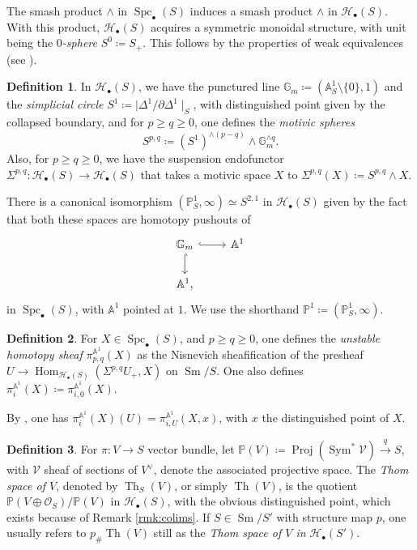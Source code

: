 \documentclass[10pt]{amsart}
\theoremstyle{definition}
\newtheorem{defn}{Definition}[section]
\theoremstyle{plain}
\numberwithin{equation}{section}
\newcommand{\0}{\emptyset}
\newcommand{\sH}{{\mathcal H}}
\newcommand{\sV}{{\mathcal V}}
\newcommand{\A}{{\mathbb A}}
\newcommand{\G}{{\mathbb G}}
\renewcommand{\P}{{\mathbb P}}
\newcommand{\Th}{{\operatorname{Th}}}
\newcommand{\Spc}{{\operatorname{Spc}}}
\newcommand{\Sm}{{\operatorname{Sm}}}
\newcommand{\Hom}{{\operatorname{Hom}}}
\newcommand{\Sym}{{\operatorname{Sym}}}
\begin{document}
The smash product $\wedge$ in $\Spc_{\bullet}(S)$ induces a smash product $\wedge$ in $\sH_{\bullet}(S)$. With this product, $\sH_{\bullet}(S)$ acquires a symmetric monoidal structure, with unit being the \emph{$0$-sphere} $S^0\coloneqq S_+$. This follows by the properties of weak equivalences (see \cite[Section 3, pp.585-586]{voe:homotopy_theory}).

\begin{defn}
    In $\sH_{\bullet}(S)$, we have the punctured line $\G_m \coloneqq (\A^1_S\setminus \{0\},1)$ and the \emph{simplicial circle} $S^1 \coloneqq \mid \Delta^1/\partial \Delta^1 \mid_S$, with distinguished point given by the collapsed boundary, and for $p \ge q \ge 0$, one defines the \emph{motivic spheres}
    $$S^{p,q} \coloneqq (S^1)^{\wedge (p-q)} \wedge \G_m^{\wedge q}.$$
    Also, for $p \ge q \ge 0$, we have the suspension endofunctor $\Sigma^{p,q}: \sH_{\bullet}(S) \to \sH_{\bullet}(S)$ that takes a motivic space $X$ to $\Sigma^{p,q}(X) \coloneqq S^{p,q} \wedge X$.
\end{defn}

There is a canonical isomorphism $(\P^1_S,\infty)\simeq S^{2,1}$ in $\sH_{\bullet}(S)$ given by the fact that both these spaces are homotopy pushouts of
$$
\begin{tikzcd}
    \G_m \arrow[r, hook] \arrow[d, hook] & \A^1 \\
    \A^1,
\end{tikzcd}
$$
in $\Spc_{\bullet}(S)$, with $\A^1$ pointed at $1$. We use the shorthand $\P^1 \coloneqq (\P^1_S,\infty)$.

\begin{defn}
    For $X \in \Spc_{\bullet}(S)$, and $p \ge q \ge 0$, one defines the \emph{unstable homotopy sheaf} $\pi_{p,q}^{\A^1}(X)$ as the Nisnevich sheafification of the presheaf $U \to \Hom_{\sH_{\bullet}(S)}(\Sigma^{p,q}U_+,X)$ on $\Sm/S$. One also defines $\pi_i^{\A^1}(X) \coloneqq \pi_{i,0}^{\A^1}(X)$.
\end{defn}

By \cite[Lemma 3.8]{voe:homotopy_theory}, one has $\pi_i^{\A^1}(X)(U) = \pi_{i,U}^{\A^1}(X,x)$, with $x$ the distinguished point of $X$.

\begin{defn}
    For $\pi: V\to S$ vector bundle, let $\P(V) \coloneqq \operatorname{Proj}(\Sym^*\sV)\xrightarrow{q}S$, with $\sV$ sheaf of sections of $V^\vee$, denote the associated projective space. The \emph{Thom space of $V$}, denoted by $\Th_S(V)$, or simply $\Th(V)$, is the quotient $\P(V \oplus \mathcal{O}_S)/\P(V)$ in $\sH_{\bullet}(S)$, with the obvious distinguished point, which exists because of Remark \ref{rmk:colims}. If $S \in \Sm/S'$ with structure map $p$, one usually refers to $p_\#\Th(V)$ still as the \emph{Thom space of $V$ in} $\sH_{\bullet}(S')$.
\end{defn}
\end{document}
